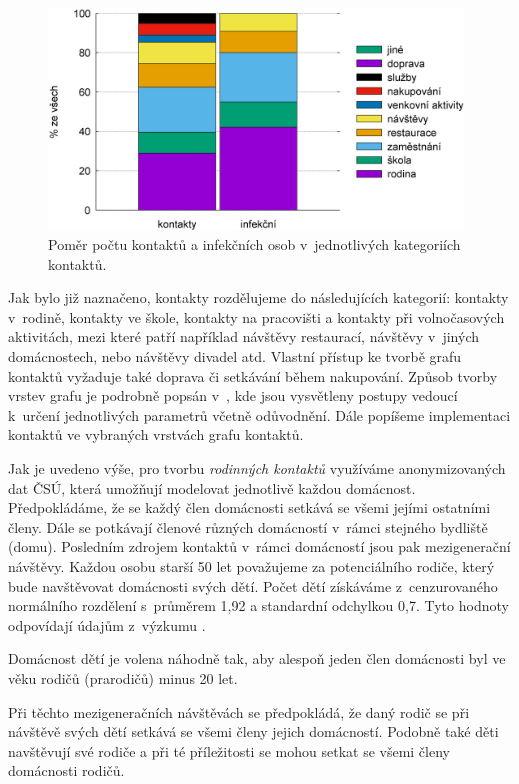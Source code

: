 \begin{figure}
    \centering
    \includegraphics[width=11cm]{pic/filled_cz.eps}
    \caption{Poměr počtu kontaktů a infekčních osob v~jednotlivých kategoriích kontaktů.}
    \label{kategorie}
\end{figure}

Jak bylo již naznačeno, kontakty rozdělujeme do následujících kategorií: kontakty v~rodině, kontakty ve škole, kontakty na pracovišti a kontakty při volnočasových aktivitách, mezi které patří například návštěvy restaurací, návštěvy v~jiných domácnostech, nebo návštěvy divadel atd. Vlastní přístup ke tvorbě grafu kontaktů vy\-ža\-du\-je také doprava či setkávání během nakupování. Způsob tvorby vrstev grafu je podrobně popsán v~\cite{M-techrep2021}, kde jsou vysvětleny postupy vedoucí k~určení jednotlivých parametrů včetně odůvodnění. Dále popíšeme implementaci kontaktů ve vybraných vrstvách grafu kontaktů.

Jak je uvedeno výše, pro tvorbu \emph{rodinných kontaktů} využíváme anonymizovaných dat ČSÚ, která umožňují modelovat jednotlivě každou domácnost. Předpokládáme, že se každý člen domácnosti setkává se všemi jejími ostatními členy. Dále se potkávají členové různých domácností v~rámci stejného bydliště (domu). Posledním zdrojem kontaktů v~rámci domácností jsou pak mezigenerační návštěvy.
Každou osobu starší 50 let považujeme za potenciálního rodiče, který bude navštěvovat domácnosti svých dětí. Počet dětí získáváme z~cenzurovaného normálního rozdělení s~průměrem 1,92 a standardní odchylkou 0,7. Tyto hodnoty odpovídají údajům z~výzkumu \cite{zaj:ess}.

Domácnost dětí je volena náhodně tak, aby alespoň jeden člen domácnosti byl ve věku rodičů (prarodičů) minus 20 let.

Při těchto mezigeneračních návštěvách se předpokládá, že daný rodič se při návštěvě svých dětí setkává se všemi členy jejich domácností. Podobně také děti navštěvují své rodiče a při té příležitosti se mohou setkat se všemi členy domácnosti rodičů.


